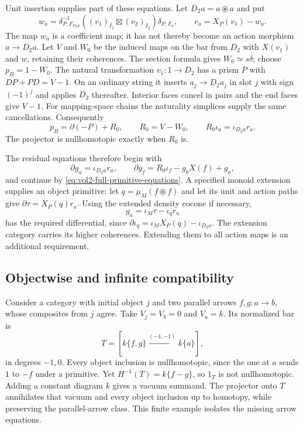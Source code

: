 Unit insertion supplies part of these equations.
Let $D_2a=a\circledast a$ and put
\[
 w_a=\delta_{P,F_{D_2a}}^{-1}
       ((v_1)_{I_1}\boxtimes(v_2)_{I_2})\delta_{P,F_a},
 \qquad r_a=X_P(v_1)-w_a.
\]
The map $w_a$ is a coefficient map; it has not thereby
become an action morphism $a\to D_2a$. Let $V$ and
$W_0$ be the induced maps on the bar from $D_2$ with
$X(v_1)$ and $w$, retaining their coherences. The
section formula gives $W_0\simeq s\delta$; choose
$p_B=1-W_0$. The natural transformation $v_1:1\to D_2$
has a prism $P$ with $DP+PD=V-1$. On an ordinary
string it inserts $a_j\to D_2a_j$ in slot $j$ with
sign $(-1)^j$ and applies $D_2$ thereafter. Interior
faces cancel in pairs and the end faces give $V-1$.
For mapping-space chains the naturality simplices
supply the same cancellations. Consequently
\begin{equation}\label{eq:vol2-unit-residual}
 p_B=\partial(-P)+R_0,\qquad
 R_0=V-W_0,\qquad
 R_0\iota_a=\iota_{D_2a}r_a.
\end{equation}
The projector is nullhomotopic exactly when $R_0$ is.

The residual equations therefore begin with
\begin{equation}\label{eq:vol2-residual-primitives}
 \partial g_a=\iota_{D_2a}r_a,\qquad
 \partial g_f=R_0\iota_f-g_bX(f)+g_a,
\end{equation}
and continue by \eqref{eq:vol2-full-primitive-equations}.
A specified monoid extension supplies an object
primitive: let $q=\mu_M(f\circledast f)$ and let its
unit and action paths give $\partial\tau=X_P(q)r_a$.
Using the extended density cocone if necessary,
\[
 g_a=\iota_M\tau-\iota_qr_a
\]
has the required differential, since
$\partial\iota_q=\iota_MX_P(q)-\iota_{D_2a}$.
The extension category carries its higher coherences.
Extending them to all action maps is an additional
requirement.

\subsection{Objectwise and infinite compatibility}

Consider a category with initial object $j$ and two
parallel arrows $f,g:a\to b$, whose composites from
$j$ agree. Take $V_j=V_b=0$ and $V_a=k$. Its
normalized bar is
\[
 T=[k\{f,g\}\xrightarrow{(-1,-1)}k\{a\}],
\]
in degrees $-1,0$. Every object inclusion is
nullhomotopic, since the one at $a$ sends $1$ to
$-f$ under a primitive. Yet $H^{-1}(T)=k\{f-g\}$,
so $1_T$ is not nullhomotopic. Adding a constant
diagram $k$ gives a vacuum summand. The projector
onto $T$ annihilates that vacuum and every object
inclusion up to homotopy, while preserving the
parallel-arrow class. This finite example isolates
the missing arrow equations.

